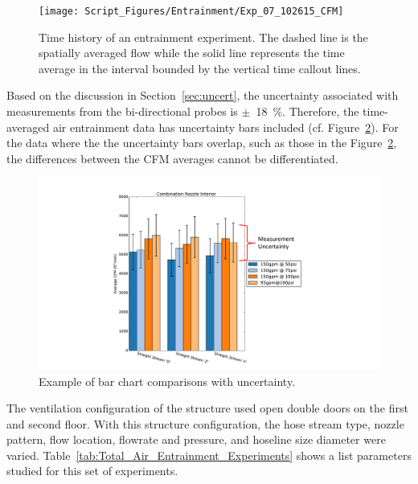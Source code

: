 \documentclass[12pt,oneside]{book}
\begin{document}
\begin{figure}[!ht]
\centering
\texttt{[image: Script\_Figures/Entrainment/Exp\_07\_102615\_CFM]} 
\caption[Time History of Entrainment Experiment]{Time history of an entrainment experiment. The dashed line is the spatially averaged flow while the solid line represents the time average in the interval bounded by the vertical time callout lines.}
\label{fig:cfmplotexplainer}
\end{figure}

Based on the discussion in Section~\ref{sec:uncert}, the uncertainty associated with measurements from the bi-directional probes is $\pm$~18~\%. Therefore, the time-averaged air entrainment data has uncertainty bars included (cf. Figure~\ref{fig:cfmbarexplainer}). For the data where the the uncertainty bars overlap, such as those in the Figure~\ref{fig:cfmbarexplainer}, the differences between the CFM averages cannot be differentiated. 

\begin{figure}[!ht]
\centering
\includegraphics[width=.7\columnwidth]{Figures/Air_Entrainment/Total_Entrainment_Example} 
\caption[Average Flow Rate Comparison]{Example of bar chart comparisons with uncertainty.}
\label{fig:cfmbarexplainer}
\end{figure}

The  ventilation configuration of the structure used open double doors on the first and second floor. With this structure configuration, the hose stream type, nozzle pattern, flow location, flowrate and pressure, and hoseline size diameter were varied. Table~\ref{tab:Total_Air_Entrainment_Experiments} shows a list parameters studied for this set of experiments.
\end{document}
